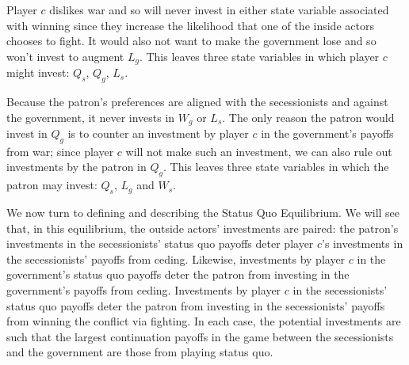 Player $c$ dislikes war and so will never invest in either state variable associated with winning since they increase the likelihood that one of the inside actors chooses to fight. It would also not want to make the government lose and so won't invest to augment $L_g$. This leaves three state variables in which player $c$ might invest: $Q_s$, $Q_g$, $L_s$.

Because the patron's preferences are aligned with the secessionists and against the government, it never invests in $W_g$ or $L_s$. The only reason the patron would invest in $Q_g$ is to counter an investment by player $c$ in the government's payoffs from war; since player $c$ will not make such an investment, we can also rule out investments by the patron in $Q_g$. This leaves three state variables in which the patron may invest: $Q_s$, $L_g$ and $W_s$.

We now turn to defining and describing the Status Quo Equilibrium. We will see that, in this equilibrium, the outside actors' investments are paired: the patron's investments in the secessionists' status quo payoffs deter player $c$'s investments in the secessionists' payoffs from ceding. Likewise, investments by player $c$ in the government's status quo payoffs deter the patron from investing in the government's payoffs from ceding. Investments by player $c$ in the secessionists' status quo payoffs deter the patron from investing in the secessionists' payoffs from winning the conflict via fighting. In each case, the potential  investments are such that the largest continuation payoffs in the game between the secessionists and the government are those from playing status quo.

